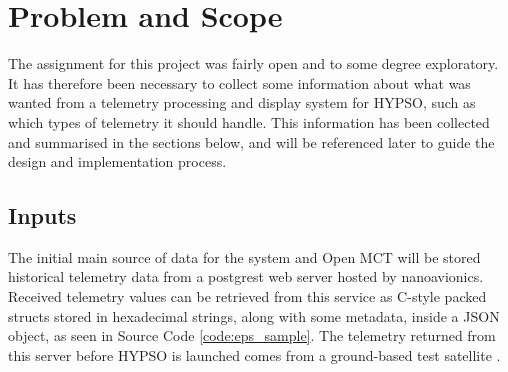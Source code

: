 \begin{comment}
Assignment has no clear scope or specification, exploratory to some degree since much of it is unknown - set own requirements

Design Open MCT implementation; get telemetry from different sources, parse and adapt for display

Minimize overhead with adding new data sources - should require work in a small amount of new code; backend and frontend needs to be flexible

Prioritize loading and working with current known data sources (NA telemetry)
Requirements
 - Should be able to load current NA telemetry from their DB
 - Needs to be modular and maintainable
 - Should be able to provide x amount of data to x users in x time
 
What do we have to work with - how do we get telemetry, what form does it come in?
 - C struct stored in hex string

What restrictions do we have on how/when/where we can get the telemetry?
 - Restricted by IP, cannot get telemetry from anywhere easily - need to go through NA contact person to get new machines added

What does Open MCT need?
 - Object provider
 - Telemetry provider
 - Telemetry metadata provider
\end{comment}

\section{Problem and Scope} \label{scope}
The assignment for this project was fairly open and to some degree exploratory. It has therefore been necessary to collect some information about what was wanted from a telemetry processing and display system for HYPSO, such as which types of telemetry it should handle. This information has been collected and summarised in the sections below, and will be referenced later to guide the design and implementation process.

\subsection{Inputs}
The initial main source of data for the system and Open MCT will be stored historical telemetry data from a \Gls{postgrest} web server hosted by \Gls{nanoavionics}. Received telemetry values can be retrieved from this service as C-style packed \glspl{struct} stored in hexadecimal strings, along with some \gls{metadata}, inside a JSON object, as seen in Source Code \ref{code:eps_sample}. The telemetry returned from this server before HYPSO is launched comes from a ground-based test satellite \cite{na_postgrest}.

